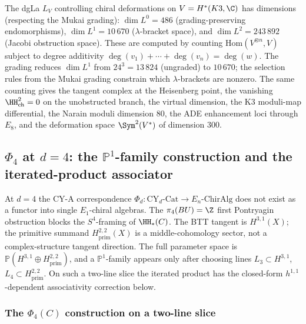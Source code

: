\begin{remark}
\label{rem:derived-stack-dimensions}
The dgLa $L_V$ controlling chiral deformations on
$V = H^*(K3, \C)$ has dimensions (respecting the Mukai grading):
$\dim L^0 = 486$ (grading-preserving endomorphisms),
$\dim L^1 = 10\,670$ ($\lambda$-bracket space), and
$\dim L^2 = 243\,892$ (Jacobi obstruction space). These are
computed by counting $\mathrm{Hom}(V^{\otimes n}, V)$ subject to
degree additivity $\deg(v_1) + \cdots + \deg(v_n) = \deg(w)$.
The grading reduces $\dim L^1$ from $24^3 = 13\,824$
(ungraded) to $10\,670$; the selection rules from the
Mukai grading constrain which $\lambda$-brackets are nonzero.
The same counting gives the tangent complex at the Heisenberg point,
the vanishing \(\HH^2_{\mathrm{ch}}=0\) on the unobstructed branch, the
virtual dimension, the K3 moduli-map differential, the Narain moduli
dimension \(80\), the ADE enhancement loci through \(E_8\), and the
deformation space \(\Sym^2(V^*)\) of dimension \(300\).
\end{remark}


\subsection{\texorpdfstring{$\Phi_4$}{Phi-4} at \texorpdfstring{$d=4$}{d=4}: the \texorpdfstring{$\mathbb{P}^1$}{P-1}-family construction and the iterated-product associator}
\label{subsec:cy4-p1-family-phi-4}

At $d=4$ the CY-A correspondence $\Phi_d : \mathrm{CY}_d\text{-Cat} \to E_n\text{-ChirAlg}$
does not exist as a functor into single $E_1$-chiral algebras. The
\(\pi_4(BU)=\Z\) first Pontryagin obstruction blocks the \(S^4\)-framing of
\(\HH_*(C)\). The BTT tangent is \(H^{3,1}(X)\); the primitive summand
\(H^{2,2}_{\mathrm{prim}}(X)\) is a middle-cohomology sector, not a
complex-structure tangent direction. The full parameter space is
\(\mathbb P(H^{3,1}\oplus H^{2,2}_{\mathrm{prim}})\), and a
\(\mathbb P^1\)-family appears only after choosing lines
\(L_3\subset H^{3,1}\), \(L_4\subset H^{2,2}_{\mathrm{prim}}\). On such a
two-line slice the iterated product has the closed-form
\(h^{1,1}\)-dependent associativity correction below.

\subsubsection{The \texorpdfstring{$\Phi_4(C)$}{Phi-4(C)} construction on a two-line slice}
\label{subsubsec:phi-4-four-arrow}


